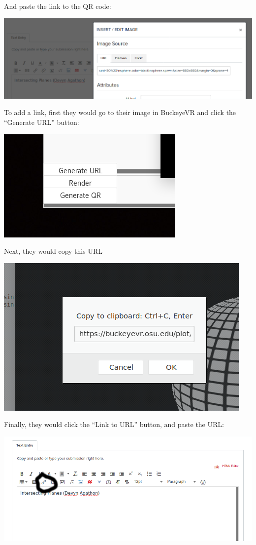 \documentclass[noauthor,nooutcomes]{ximera}
\begin{document}
And paste the link to the QR code:
\begin{image}
  \includegraphics{pasteQR.png}
\end{image}
To add a link, first they would go to their image in BuckeyeVR and
click the ``Generate URL'' button:
\begin{image}
  \includegraphics{generate.png}
\end{image}
Next, they would copy this URL
\begin{image}
  \includegraphics{copyURL.png}
\end{image}
Finally, they would click the ``Link to URL'' button, and paste the URL:
\begin{image}
  \includegraphics{URLButton.png}
\end{image}
\end{document}
